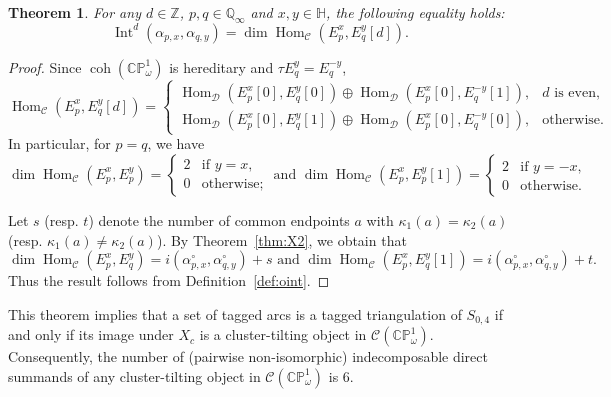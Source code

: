 \documentclass[11pt,a4paper,reqno]{amsart}%
\theoremstyle{plain}
\newtheorem{theorem}{Theorem}[section]
\theoremstyle{definition}
\numberwithin{equation}{section}
\numberwithin{equation}{section}
\newcommand{\cC}{\mathcal{C}}
\newcommand{\cD}{\mathcal{D}}
\newcommand{\QQi}{\mathbb{Q}_\infty}
\newcommand{\Int}{\operatorname{Int}\nolimits}
\newcommand{\Hom}{\operatorname{Hom}\nolimits}
\def\wt{\omega}
\def\coh{\operatorname{coh}}
\def\Hom{\operatorname{Hom}}
\def\coh{\operatorname{coh}}
\def\CPone{\mathbb{CP}^1_{\wt}}
\def\CCP{\mathcal{C}(\CPone)}
\newcommand{\bfH}{\mathbb{H}}
\begin{document}
\begin{theorem}\label{thm:C2}
For any $d\in\mathbb{Z}$,  $p,q\in\QQi$  and $x,y\in\bfH$,   the following equality holds:
\[
    \Int^d( \alpha_{p,x},\alpha_{q,y})=\dim\Hom_\cC  ( {E}_p^x, {E}_q^y[d]  ).
\]
\end{theorem}
\begin{proof} 
Since $\coh(\CPone)$ is hereditary and $\tau {E}_q^y={E}_q^{-y}$,  
\[
\Hom_\cC  (  {E}_p^x ,  {E}_q^y [d]  )=\begin{cases}
     \Hom_{\cD} (  E_p^x[0] , E_q^y[0]   )\oplus\Hom_{\cD} (  E_p^x[0]  ,  E_q^{-y}[1]  ), & \text{$d$ is even,}\\
     \Hom_{\cD} (  E_p^x[0]  , E_q^y[1]   )\oplus\Hom_{\cD} (  E_p^x[0]  ,  E_q^{-y}[0]  ), & \text{otherwise.} 
\end{cases}
\]
In particular, for $p=q$, we have   
\[
\dim\Hom_\cC  (   {E}_p^x ,  {E}_p^y  )=\begin{cases}
2 & \text{if $y=x$,}\\
 0 & \text{otherwise;}   
\end{cases}
\text{ and }
\dim\Hom_\cC  (  {E}_p^x , {E}_p^y[1]   )=\begin{cases}
2 & \text{if $y=-x$,}\\
 0 & \text{otherwise.}   
\end{cases}
\]

Let $s$ (resp. $t$) denote the number of common endpoints $a$ with $\kappa_1(a)=\kappa_2(a)$ (resp. $\kappa_1(a)\ne\kappa_2(a)$). By   Theorem~\ref{thm:X2}, we obtain that
\[
\dim\Hom_\cC (   {E}_p^x ,  {E}_q^y  )= i(\alpha_{p,x}^\circ,\alpha_{q,y}^\circ)+s\text{ and }
\dim\Hom_\cC  (   {E}_p^x ,  {E}_q^y [1]  )= i(\alpha_{p,x}^\circ,\alpha_{q,y}^\circ)+t.
\]
Thus the result follows from Definition~\ref{def:oint}.
\end{proof}

This theorem implies that a set   of tagged arcs is a tagged triangulation of $S_{0,4}$  if and only if its image under $X_c $ is a cluster-tilting object in $\CCP$.  Consequently, the number of (pairwise non-isomorphic) indecomposable direct summands of any cluster-tilting object in   $\CCP$  is  6. 
\end{document}
